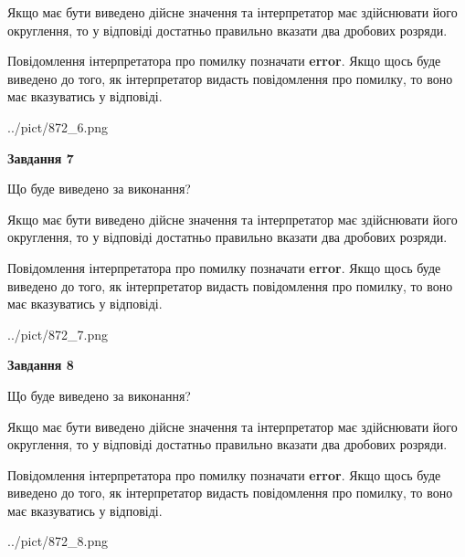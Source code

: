 \documentclass[12pt, ukrainian]{article}
\begin{document}
{\begin {Large}
Якщо має бути виведено дійсне значення та інтерпретатор має здійснювати його округлення, 
то у відповіді достатньо правильно вказати два дробових розряди.

Повідомлення інтерпретатора про помилку позначати \textbf{error}.
Якщо щось буде виведено до того, як інтерпретатор видасть повідомлення про помилку, 
то воно має вказуватись у відповіді. \par

\begin{center}
	{../pict/872_6.png}
\end{center}
\newpage

{\begin {center}\textbf{Завдання 7}\end {center}}\par
Що буде виведено за виконання? \par

Якщо має бути виведено дійсне значення та інтерпретатор має здійснювати його округлення, 
то у відповіді достатньо правильно вказати два дробових розряди.

Повідомлення інтерпретатора про помилку позначати \textbf{error}.
Якщо щось буде виведено до того, як інтерпретатор видасть повідомлення про помилку, 
то воно має вказуватись у відповіді. \par

\begin{center}
	{../pict/872_7.png}
\end{center}
\newpage

{\begin {center}\textbf{Завдання 8}\end {center}}\par
Що буде виведено за виконання? \par

Якщо має бути виведено дійсне значення та інтерпретатор має здійснювати його округлення, 
то у відповіді достатньо правильно вказати два дробових розряди.

Повідомлення інтерпретатора про помилку позначати \textbf{error}.
Якщо щось буде виведено до того, як інтерпретатор видасть повідомлення про помилку, 
то воно має вказуватись у відповіді. \par

\begin{center}
	{../pict/872_8.png}
\end{center}
\newpage


\end{Large}}
\end{document}
